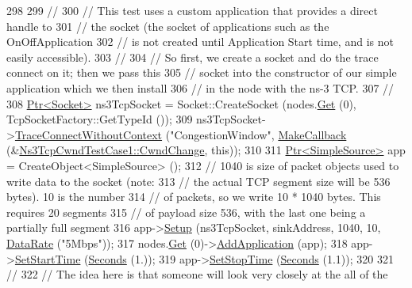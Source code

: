 \begin{DoxyCode}
298 
299   \textcolor{comment}{//}
300   \textcolor{comment}{// This test uses a custom application that provides a direct handle to}
301   \textcolor{comment}{// the socket (the socket of applications such as the OnOffApplication}
302   \textcolor{comment}{// is not created until Application Start time, and is not easily accessible).}
303   \textcolor{comment}{//}
304   \textcolor{comment}{// So first, we create a socket and do the trace connect on it; then we pass this}
305   \textcolor{comment}{// socket into the constructor of our simple application which we then install}
306   \textcolor{comment}{// in the node with the ns-3 TCP.}
307   \textcolor{comment}{//}
308   \hyperlink{classns3_1_1Ptr}{Ptr<Socket>} ns3TcpSocket = Socket::CreateSocket (nodes.\hyperlink{classns3_1_1NodeContainer_a9ed96e2ecc22e0f5a3d4842eb9bf90bf}{Get} (0), TcpSocketFactory::GetTypeId
       ());
309   ns3TcpSocket->\hyperlink{classns3_1_1ObjectBase_a1be45f6fd561e75dcac9dfa81b2b81e4}{TraceConnectWithoutContext} (\textcolor{stringliteral}{"CongestionWindow"}, 
      \hyperlink{group__makecallbackmemptr_ga9376283685aa99d204048d6a4b7610a4}{MakeCallback} (&\hyperlink{classNs3TcpCwndTestCase1_a78d0fac3fbeca9c5d14637f3233d26e7}{Ns3TcpCwndTestCase1::CwndChange}, \textcolor{keyword}{this}));
310 
311   \hyperlink{classns3_1_1Ptr}{Ptr<SimpleSource>} app = CreateObject<SimpleSource> ();
312   \textcolor{comment}{// 1040 is size of packet objects used to write data to the socket (note:}
313   \textcolor{comment}{// the actual TCP segment size will be 536 bytes).  10 is the number}
314   \textcolor{comment}{// of packets, so we write 10 * 1040 bytes.  This requires 20 segments}
315   \textcolor{comment}{// of payload size 536, with the last one being a partially full segment}
316   app->\hyperlink{classSimpleSource_aa6ca35f5717073eccd278f9afa3d41d5}{Setup} (ns3TcpSocket, sinkAddress, 1040, 10, \hyperlink{classns3_1_1DataRate}{DataRate} (\textcolor{stringliteral}{"5Mbps"}));
317   nodes.\hyperlink{classns3_1_1NodeContainer_a9ed96e2ecc22e0f5a3d4842eb9bf90bf}{Get} (0)->\hyperlink{classns3_1_1Node_ab98b4fdc4aadc86366b80e8a79a53f47}{AddApplication} (app);
318   app->\hyperlink{classns3_1_1Application_a8360a49748e30c52ffdcc7a305c3cd48}{SetStartTime} (\hyperlink{group__timecivil_ga33c34b816f8ff6628e33d5c8e9713b9e}{Seconds} (1.));
319   app->\hyperlink{classns3_1_1Application_a732c1fdadf0be176c753a2ce6e27dff9}{SetStopTime} (\hyperlink{group__timecivil_ga33c34b816f8ff6628e33d5c8e9713b9e}{Seconds} (1.1));
320 
321   \textcolor{comment}{//}
322   \textcolor{comment}{// The idea here is that someone will look very closely at the all of the}

\end{DoxyCode}
